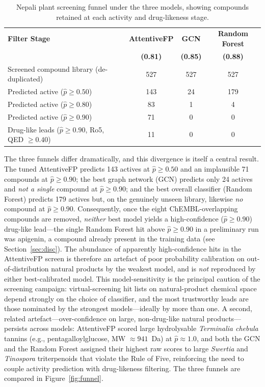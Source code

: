 \begin{table}[H]
\centering
\caption{Nepali plant screening funnel under the three models, showing compounds retained at each activity and drug-likeness stage.}
\label{tab:vs_summary}
{\singlespacing
\begin{tabular}{lccc}
\toprule
\textbf{Filter Stage} & \textbf{AttentiveFP} & \textbf{GCN} & \textbf{Random Forest} \\
                      & \textbf{(0.81)}      & \textbf{(0.85)} & \textbf{(0.88)} \\
\midrule
Screened compound library (de-duplicated)       & 527 & 527 & 527 \\
Predicted active ($\hat{p} \geq 0.50$)          & 143 &  24 & 179 \\
Predicted active ($\hat{p} \geq 0.80$)          &  83 &   1 &   4 \\
Predicted active ($\hat{p} \geq 0.90$)          &  71 &   0 &   0 \\
Drug-like leads ($\hat{p} \geq 0.90$, Ro5, QED $\geq 0.40$) & 11 & 0 & 0 \\
\bottomrule
\end{tabular}
}
\end{table}

The three funnels differ dramatically, and this divergence is itself a central
result. The tuned AttentiveFP predicts 143 actives at $\hat{p} \geq 0.50$ and an
implausible 71 compounds at $\hat{p} \geq 0.90$; the best graph network (GCN)
predicts only 24 actives and \emph{not a single} compound at $\hat{p} \geq 0.90$;
and the best overall classifier (Random Forest) predicts 179 actives but, on the
genuinely unseen library, likewise \emph{no} compound at $\hat{p} \geq 0.90$.
Consequently, once the eight ChEMBL-overlapping compounds are removed, \emph{neither}
best model yields a high-confidence ($\hat{p} \geq 0.90$) drug-like lead---the single
Random Forest hit above $\hat{p} \geq 0.90$ in a preliminary run was apigenin, a
compound already present in the training data (see Section~\ref{sec:disc}). The
abundance of apparently high-confidence hits in the AttentiveFP screen is therefore an
artefact of poor probability calibration on out-of-distribution natural products by
the weakest model, and is \emph{not} reproduced by either best-calibrated model. This
model-sensitivity is the principal caution of the screening campaign: virtual-screening
hit lists on natural-product chemical space depend strongly on the choice of
classifier, and the most trustworthy leads are those nominated by the strongest
models---ideally by more than one. A second, related artefact---over-confidence on
large, non-drug-like natural products---persists across models: AttentiveFP scored
large hydrolysable \textit{Terminalia chebula} tannins (e.g., pentagalloylglucose,
MW $\approx 941$~Da) at $\hat{p} \approx 1.0$, and both the GCN and the Random Forest
assigned their highest raw scores to large \textit{Swertia} and \textit{Tinospora}
triterpenoids that violate the Rule of Five, reinforcing the need to couple activity
prediction with drug-likeness filtering. The three funnels are compared in
Figure~\ref{fig:funnel}.

